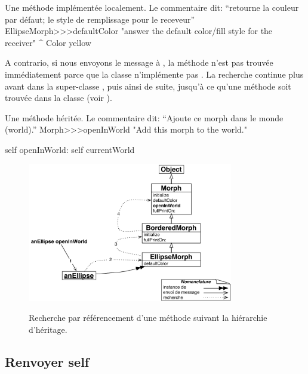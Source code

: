 \documentclass[a4paper,10pt,twoside]{book}
\begin{document}
\begin{method}[defaultColor]{Une méthode implémentée localement. Le commentaire dit: ``retourne la couleur par défaut; le style de remplissage pour le receveur''}
EllipseMorph>>>defaultColor
	"answer the default color/fill style for the receiver"
	^ Color yellow
\end{method}

A contrario, si nous envoyons le message  à \mbox{,} la méthode n'est pas trouvée immédiatement parce que la classe  n'implémente pas .
La recherche continue plus avant dans la super-classe \mbox{,} puis ainsi de suite, jusqu'à ce qu'une méthode  soit trouvée dans la classe  (voir ).

\begin{method}[openInWorld]{Une méthode héritée. Le commentaire dit: ``Ajoute ce morph dans le monde (world).''}
Morph>>>openInWorld
	"Add this morph to the world."

  self openInWorld: self currentWorld
\end{method} %

\begin{figure}[htb]
\begin{center}
	{\includegraphics[width=0.8\textwidth]{openInWorldLookup}}
\caption{Recherche par référencement d'une méthode suivant la hiérarchie d'héritage.}
\end{center}
\end{figure}

\subsection{Renvoyer self}
\end{document}
